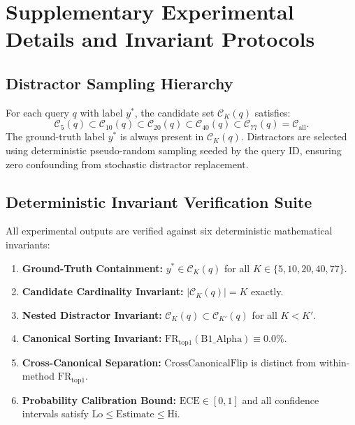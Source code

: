 \documentclass[10pt]{article}
\begin{document}



\appendix
\section{Supplementary Experimental Details and Invariant Protocols}

\subsection{Distractor Sampling Hierarchy}
For each query $q$ with label $y^*$, the candidate set $\mathcal{C}_K(q)$ satisfies:
\begin{equation}
\mathcal{C}_5(q) \subset \mathcal{C}_{10}(q) \subset \mathcal{C}_{20}(q) \subset \mathcal{C}_{40}(q) \subset \mathcal{C}_{77}(q) = \mathcal{C}_{\text{all}}.
\end{equation}
The ground-truth label $y^*$ is always present in $\mathcal{C}_K(q)$. Distractors are selected using deterministic pseudo-random sampling seeded by the query ID, ensuring zero confounding from stochastic distractor replacement.

\subsection{Deterministic Invariant Verification Suite}
All experimental outputs are verified against six deterministic mathematical invariants:
\begin{enumerate}
    \item \textbf{Ground-Truth Containment:} $y^* \in \mathcal{C}_K(q)$ for all $K \in \{5, 10, 20, 40, 77\}$.
    \item \textbf{Candidate Cardinality Invariant:} $|\mathcal{C}_K(q)| = K$ exactly.
    \item \textbf{Nested Distractor Invariant:} $\mathcal{C}_K(q) \subset \mathcal{C}_{K'}(q)$ for all $K < K'$.
    \item \textbf{Canonical Sorting Invariant:} $\mathrm{FR}_{\mathrm{top1}}(\text{B1\_Alpha}) \equiv 0.0\%$.
    \item \textbf{Cross-Canonical Separation:} $\mathrm{CrossCanonicalFlip}$ is distinct from within-method $\mathrm{FR}_{\mathrm{top1}}$.
    \item \textbf{Probability Calibration Bound:} $\mathrm{ECE} \in [0, 1]$ and all confidence intervals satisfy $\text{Lo} \le \text{Estimate} \le \text{Hi}$.
\end{enumerate}
\end{document}
